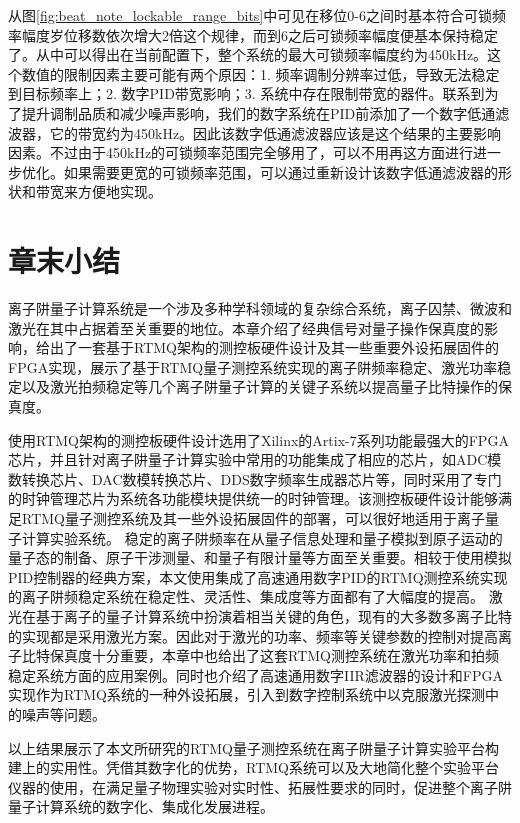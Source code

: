 从图\ref{fig:beat_note_lockable_range_bits}中可见在移位0-6之间时基本符合可锁频率幅度岁位移数依次增大2倍这个规律，而到6之后可锁频率幅度便基本保持稳定了。从中可以得出在当前配置下，整个系统的最大可锁频率幅度约为450kHz。这个数值的限制因素主要可能有两个原因：1. 频率调制分辨率过低，导致无法稳定到目标频率上；2. 数字PID带宽影响；3. 系统中存在限制带宽的器件。联系到为了提升调制品质和减少噪声影响，我们的数字系统在PID前添加了一个数字低通滤波器，它的带宽约为450kHz。因此该数字低通滤波器应该是这个结果的主要影响因素。不过由于450kHz的可锁频率范围完全够用了，可以不用再这方面进行进一步优化。如果需要更宽的可锁频率范围，可以通过重新设计该数字低通滤波器的形状和带宽来方便地实现。

\newpage
\section[章末小结]{章末小结}

离子阱量子计算系统是一个涉及多种学科领域的复杂综合系统，离子囚禁、微波和激光在其中占据着至关重要的地位。本章介绍了经典信号对量子操作保真度的影响，给出了一套基于RTMQ架构的测控板硬件设计及其一些重要外设拓展固件的FPGA实现，展示了基于RTMQ量子测控系统实现的离子阱频率稳定、激光功率稳定以及激光拍频稳定等几个离子阱量子计算的关键子系统以提高量子比特操作的保真度。

使用RTMQ架构的测控板硬件设计选用了Xilinx的Artix-7系列功能最强大的FPGA芯片，并且针对离子阱量子计算实验中常用的功能集成了相应的芯片，如ADC模数转换芯片、DAC数模转换芯片、DDS数字频率生成器芯片等，同时采用了专门的时钟管理芯片为系统各功能模块提供统一的时钟管理。该测控板硬件设计能够满足RTMQ量子测控系统及其一些外设拓展固件的部署，可以很好地适用于离子量子计算实验系统。
稳定的离子阱频率在从量子信息处理和量子模拟到原子运动的量子态的制备、原子干涉测量、和量子有限计量等方面至关重要。相较于使用模拟PID控制器的经典方案，本文使用集成了高速通用数字PID的RTMQ测控系统实现的离子阱频稳定系统在稳定性、灵活性、集成度等方面都有了大幅度的提高。
激光在基于离子的量子计算系统中扮演着相当关键的角色，现有的大多数多离子比特的实现都是采用激光方案。因此对于激光的功率、频率等关键参数的控制对提高离子比特保真度十分重要，本章中也给出了这套RTMQ测控系统在激光功率和拍频稳定系统方面的应用案例。同时也介绍了高速通用数字IIR滤波器的设计和FPGA实现作为RTMQ系统的一种外设拓展，引入到数字控制系统中以克服激光探测中的噪声等问题。

以上结果展示了本文所研究的RTMQ量子测控系统在离子阱量子计算实验平台构建上的实用性。凭借其数字化的优势，RTMQ系统可以及大地简化整个实验平台仪器的使用，在满足量子物理实验对实时性、拓展性要求的同时，促进整个离子阱量子计算系统的数字化、集成化发展进程。





